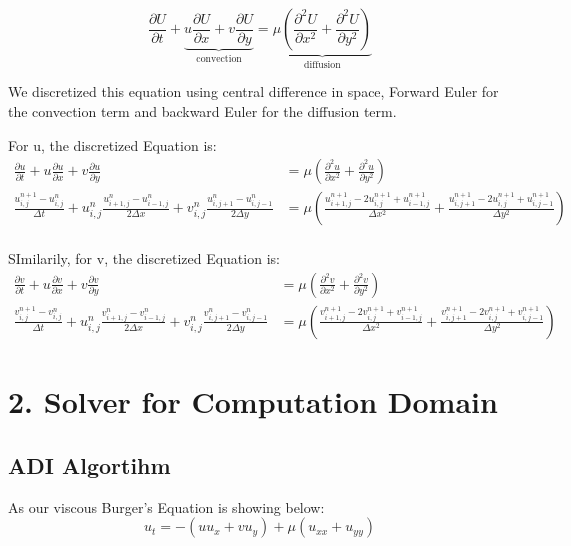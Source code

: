 \documentclass[12pt]{article}
\begin{document}
$$
\frac{\partial U}{\partial t} + \underbrace{u\frac{\partial U}{\partial x} + v\frac{\partial U}{\partial y}}_{\text{convection}} = \underbrace{\mu\left(\frac{\partial^2 U}{\partial x^2} + \frac{\partial^2 U}{\partial y^2}\right)}_{\text{diffusion}}
$$


We discretized this equation using central difference in space, Forward Euler for the convection term and backward Euler for the diffusion term.

For u, the discretized Equation is:
\begin{align*}
    \frac{\partial u}{\partial t} + u\frac{\partial u}{\partial x} + v\frac{\partial u}{\partial y} &= \mu \left(\frac{\partial^2 u}{\partial x^2} + \frac{\partial^2 u}{\partial y^2}\right) \\
    \frac{u_{i,j}^{n+1} - u_{i,j}^n}{\Delta t} + u_{i,j}^n \frac{u_{i+1,j}^n - u_{i-1,j}^n}{2\Delta x} + v_{i,j}^n \frac{u_{i,j+1}^n - u_{i,j-1}^n}{2\Delta y} &= \mu \left( \frac{u_{i+1,j}^{n+1} - 2u_{i,j}^{n+1} + u_{i-1,j}^{n+1}}{\Delta x^2} + \frac{u_{i,j+1}^{n+1} - 2u_{i,j}^{n+1} + u_{i,j-1}^{n+1}}{\Delta y^2} \right) \\
\end{align*}
    

SImilarily, for v, the discretized Equation is:
\begin{align*}
    \frac{\partial v}{\partial t} + u\frac{\partial v}{\partial x} + v\frac{\partial v}{\partial y} &= \mu \left(\frac{\partial^2 v}{\partial x^2} + \frac{\partial^2 v}{\partial y^2}\right) \\
    \frac{v_{i,j}^{n+1} - v_{i,j}^n}{\Delta t} + u_{i,j}^n \frac{v_{i+1,j}^n - v_{i-1,j}^n}{2\Delta x} + v_{i,j}^n \frac{v_{i,j+1}^n - v_{i,j-1}^n}{2\Delta y} &= \mu \left( \frac{v_{i+1,j}^{n+1} - 2v_{i,j}^{n+1} + v_{i-1,j}^{n+1}}{\Delta x^2} + \frac{v_{i,j+1}^{n+1} - 2v_{i,j}^{n+1} + v_{i,j-1}^{n+1}}{\Delta y^2} \right)
\end{align*}


\section{2. Solver for Computation Domain}
\subsection{ADI Algortihm}

As our viscous Burger's Equation is showing below:
$$
u_t = - (u u_x + v u_y) + \mu(u_{xx} + u_{yy})
$$
\end{document}
